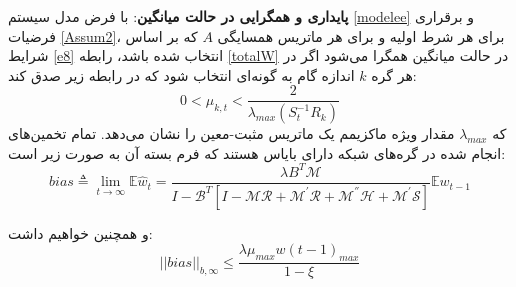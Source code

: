 \begin{theorem}\label{Theorem1}
	\textbf{پایداری و همگرایی در حالت میانگین}: با فرض مدل سیستم \ref{modelee} و برقراری فرضیات \ref{Assum2}، برای هر شرط اولیه و برای هر ماتریس همسایگی $A$ که بر اساس شرایط \ref{e8} انتخاب شده باشد، رابطه \ref{totalW} در حالت میانگین همگرا می‌شود اگر در هر گره $k$ اندازه گام به گونه‌ای انتخاب شود که در رابطه زیر صدق کند:
	\begin{equation}\label{muCondition}
		0<\mu_{k,t}< \frac{2}{\lambda_{max} (S_t^{-1}R_k)}
	\end{equation}	
	که $\lambda_{max}$ مقدار ویژه ماکزیمم یک ماتریس مثبت-معین را نشان می‌دهد. تمام تخمین‌های انجام شده در گره‌های شبکه دارای بایاس هستند که فرم بسته آن به صورت زیر است:	
	\begin{equation}
		bias\triangleq \lim_{t\rightarrow \infty} \mathbb{E}\hat{w}_t=\frac{\lambda B^T \mathcal{M}}{I-\mathcal{B}^T [ I-\mathcal{M}\mathcal{R}+\mathcal{M}^{'}\mathcal{R}+\mathcal{M}^{''}\mathcal{H}+\mathcal{M}^{'}\mathcal{S}]}\mathbb{E}w_{t-1}
	\end{equation}	
	
	و همچنین خواهیم داشت:
	\begin{equation}
		||bias||_{b,\infty}\le \frac{\lambda \mu_{max}w(t-1)_{max}}{1-\xi}
	\end{equation}	
	
\end{theorem}

